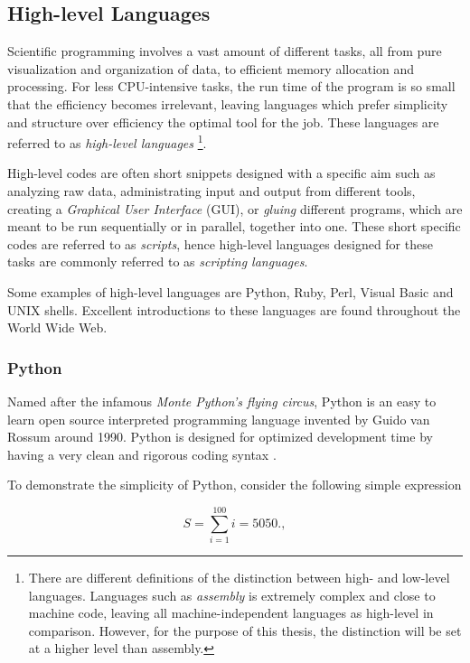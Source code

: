 \subsection{High-level Languages}

Scientific programming involves a vast amount of different tasks, all from pure visualization and organization of data, to efficient memory allocation and processing. For less CPU-intensive tasks, the run time of the program is so small that the efficiency becomes irrelevant, leaving languages which prefer simplicity and structure over efficiency the optimal tool for the job. These languages are referred to as \textit{high-level languages} \footnote{There are different definitions of the distinction between high- and low-level languages. Languages such as \textit{assembly} is extremely complex and close to machine code, leaving all machine-independent languages as high-level in comparison. However, for the purpose of this thesis, the distinction will be set at a higher level than assembly.}.

High-level codes are often short snippets designed with a specific aim such as analyzing raw data, administrating input and output from different tools, creating a \textit{Graphical User Interface} (GUI), or \textit{gluing} different programs, which are meant to be run sequentially or in parallel, together into one. These short specific codes are referred to as \textit{scripts}, hence high-level languages designed for these tasks are commonly referred to as \textit{scripting languages}\cite{inf3331, pythonBook}. 

Some examples of high-level languages are Python, Ruby, Perl, Visual Basic and UNIX shells. Excellent introductions to these languages are found throughout the World Wide Web.

\subsubsection{Python}
\label{sec:Python}

Named after the infamous \textit{Monte Python's flying circus}, Python is an easy to learn open source interpreted programming language invented by Guido van Rossum around 1990. Python is designed for optimized development time by having a very clean and rigorous coding syntax \cite{inf1100, pythonBook}. 

To demonstrate the simplicity of Python, consider the following simple expression

\begin{equation}
 S = \sum_{i=1}^{100} i = 5050.  \label{eq:sum100},
\end{equation}

